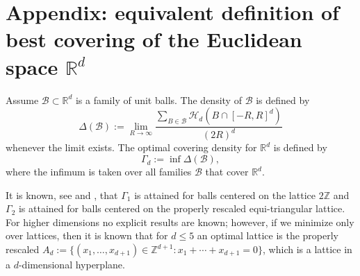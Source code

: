 \documentclass[12pt]{amsart}
\theoremstyle{definition}
\def\R{\mathbb{R}}
\newcommand{\1}{\mathbf{1}}
\def\H{\mathcal{H}}
\begin{document}
\section{Appendix: equivalent definition of best covering of the Euclidean space $\R^d$}\label{appendix}
Assume $\mathcal{B}\subset \R^d$ is a family of unit balls. The density of $\mathcal{B}$ is defined by
\begin{equation}\label{limdensity}
\Delta(\mathcal{B}):=\lim_{R\to \infty} \frac{\sum_{B\in \mathcal{B}} \H_d(B\cap [-R,R]^d)}{(2R)^d}
\end{equation}
whenever the limit exists. The optimal covering density for $\R^d$ is defined by 
$$
\Gamma_d:=\inf \Delta(\mathcal{B}),
$$
where the infimum is taken over all families $\mathcal{B}$ that cover $\R^d$.

It is known, see \cite[Chapter 2]{ConwSlBook} and \cite{Borodachov2016}, that $\Gamma_1$ is attained for balls centered on the lattice $2\mathbb{Z}$ and $\Gamma_{2}$ is attained for balls centered on the properly rescaled equi-triangular lattice. For higher dimensions no explicit results are known; however, if we minimize only over lattices, then it is known that for $d\leqslant 5$ an optimal lattice is the properly rescaled $A_d:=\{(x_1, \ldots, x_{d+1})\in \mathbb{Z}^{d+1}\colon x_1+\cdots+x_{d+1}=0\}$, which is a lattice in a $d$-dimensional hyperplane. 
\end{document}
